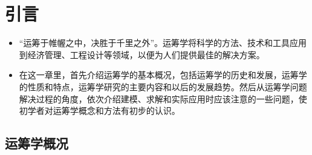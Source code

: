 \section{引言}

\begin{frame}{\secname}
\begin{itemize}
    \item “运筹于帷幄之中，决胜于千里之外”。运筹学将科学的方法、技术和工具应用到经济管理、工程设计等领域，以便为人们提供最佳的解决方案。
    \item 在这一章里，首先介绍运筹学的基本概况，包括运筹学的历史和发展，运筹学的性质和特点，运筹学研究的主要内容和以后的发展趋势。然后从运筹学问题解决过程的角度，依次介绍建模、求解和实际应用时应该注意的一些问题，使初学者对运筹学概念和方法有初步的认识。
\end{itemize}
\end{frame}

\subsection{运筹学概况}
